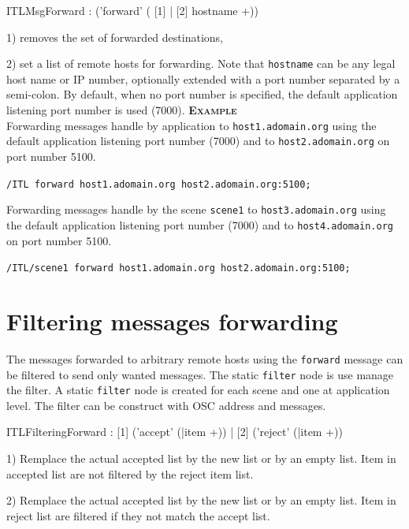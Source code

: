 \documentclass[a4paper,twoside]{report}
\newcommand{\sublevel}[1]	{\section{#1}}
\newcommand{\OSC}[1]		{\texttt{#1}}
\newcommand{\example}		{\textbf{\hspace{-1.5cm}\textbf{\textsc{Example }}}}
\let\olditemize\itemize
\let\oldenditemize\enditemize
\renewenvironment{itemize} 	{\olditemize \setlength{\itemsep}{1mm}}{\oldenditemize}
\newcommand{\sample}	[1]			{\vspace{-2mm}\begin{center}\colorbox{mygrey}{
								\begin{minipage}[t]{0.9\columnwidth} 
								{\small \texttt{#1}}
								\end{minipage}}\end{center}}
\begin{document}
\begin{rail}
ITLMsgForward : ('forward' ( [1] | [2] hostname +))
\end{rail}

\begin{itemize}

\item 1) removes the set of forwarded destinations,
\item 2) set a list of remote hosts for forwarding. Note that \OSC{hostname} can be any legal host name or IP number, optionally extended with a port number separated by a semi-colon. By default, when no port number is specified, the default application listening port number is used (7000).
\end{itemize}
\example\\
Forwarding messages handle by application to \OSC{host1.adomain.org} using the default application listening port number (7000)
and to \OSC{host2.adomain.org} on port number 5100.

\sample{/ITL forward host1.adomain.org host2.adomain.org:5100;}


Forwarding messages handle by the scene \OSC{scene1} to \OSC{host3.adomain.org} using the default application listening port number (7000)
and to \OSC{host4.adomain.org} on port number 5100.

\sample{/ITL/scene1 forward host1.adomain.org host2.adomain.org:5100;}

\sublevel{Filtering messages forwarding}
\label{ITLFilteringForward}

The messages forwarded to arbitrary remote hosts using the \OSC{forward} message can be filtered to send only wanted messages. The static \OSC{filter} node is use manage the filter. A static \OSC{filter} node is created for each scene and one at application level. The filter can be construct with OSC address and messages. 
 
\begin{rail}
ITLFilteringForward : [1] ('accept' (|item +)) | [2] ('reject' (|item +))
\end{rail}

\begin{itemize}
\item 1) Remplace the actual accepted list by the new list or by an empty list. Item in accepted list are not filtered by the reject item list.
\item 2) Remplace the actual accepted list by the new list or by an empty list. Item in reject list are filtered if they not match the accept list.
\end{itemize}
\end{document}
